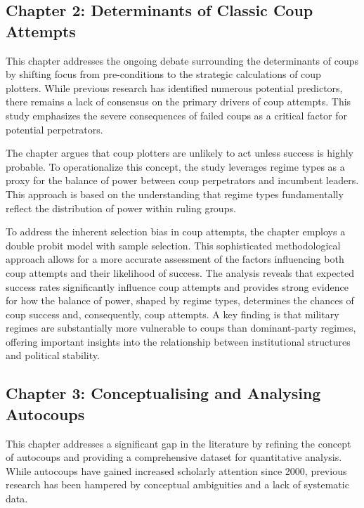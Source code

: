 \documentclass[
  12pt,
]{report}
\begin{document}
\subsection*{Chapter 2: Determinants of Classic Coup
Attempts}\label{chapter-2-determinants-of-classic-coup-attempts}

This chapter addresses the ongoing debate surrounding the determinants
of coups by shifting focus from pre-conditions to the strategic
calculations of coup plotters. While previous research has identified
numerous potential predictors, there remains a lack of consensus on the
primary drivers of coup attempts. This study emphasizes the severe
consequences of failed coups as a critical factor for potential
perpetrators.

The chapter argues that coup plotters are unlikely to act unless success
is highly probable. To operationalize this concept, the study leverages
regime types as a proxy for the balance of power between coup
perpetrators and incumbent leaders. This approach is based on the
understanding that regime types fundamentally reflect the distribution
of power within ruling groups.

To address the inherent selection bias in coup attempts, the chapter
employs a double probit model with sample selection. This sophisticated
methodological approach allows for a more accurate assessment of the
factors influencing both coup attempts and their likelihood of success.
The analysis reveals that expected success rates significantly influence
coup attempts and provides strong evidence for how the balance of power,
shaped by regime types, determines the chances of coup success and,
consequently, coup attempts. A key finding is that military regimes are
substantially more vulnerable to coups than dominant-party regimes,
offering important insights into the relationship between institutional
structures and political stability.

\subsection*{Chapter 3: Conceptualising and Analysing
Autocoups}\label{chapter-3-conceptualising-and-analysing-autocoups}

This chapter addresses a significant gap in the literature by refining
the concept of autocoups and providing a comprehensive dataset for
quantitative analysis. While autocoups have gained increased scholarly
attention since 2000, previous research has been hampered by conceptual
ambiguities and a lack of systematic data.
\end{document}
